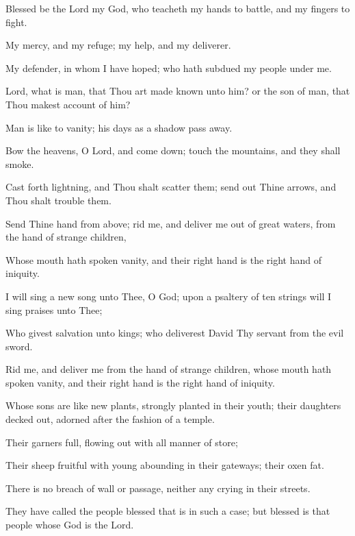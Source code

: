 Blessed be the Lord my God, who teacheth my hands to battle, and my fingers to fight.

My mercy, and my refuge; my help, and my deliverer.

My defender, in whom I have hoped; who hath subdued my people under me.

Lord, what is man, that Thou art made known unto him? or the son of man, that Thou makest account of him?

Man is like to vanity; his days as a shadow pass away.

Bow the heavens, O Lord, and come down; touch the
mountains, and they shall smoke.

Cast forth lightning, and Thou shalt scatter them; send out Thine arrows, and Thou shalt trouble them.

Send Thine hand from above; rid me, and deliver me out of great waters, from the hand of strange children,

Whose mouth hath spoken vanity, and their right hand is the right hand of iniquity.

I will sing a new song unto Thee, O God; upon a psaltery of ten strings will I sing praises unto Thee;

Who givest salvation unto kings; who deliverest David Thy servant from the evil sword.

Rid me, and deliver me from the hand of strange children, whose mouth hath spoken vanity, and their right hand is the right hand of iniquity.

Whose sons are like new plants, strongly planted in their youth; their daughters decked out, adorned after the fashion of a temple.

Their garners full, flowing out with all manner of store;

Their sheep fruitful with young abounding in their gateways; their oxen fat.

There is no breach of wall or passage, neither any crying in their streets.

They have called the people blessed that is in such a case; but blessed is that people whose God is the Lord.

